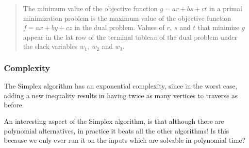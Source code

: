 \begin{quote}
  The minimum value of the objective function $g = ar + bs + ct$ in a primal
  minimization problem is the maximum value of the objective function $f = ax +
  by + cz$ in the dual problem. Values of $r,~s$ and $t$ that minimize $g$
  appear in the lat row of the terminal tableau of the dual problem under the
  slack variables $w_1,~w_2$ and $w_3$.
\end{quote}

\subsubsection{Complexity}

The Simplex algorithm has an exponential complexity, since in the worst case,
adding a new inequality results in having twice as many vertices to traverse as
before.

An interesting aspect of the Simplex algorithm, is that although there are
polynomial alternatives, in practice it beats all the other algorithms! Is this
because we only ever run it on the inputs which are solvable in polynomial time?
